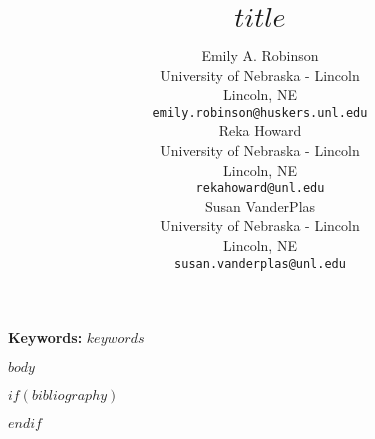 \documentclass[10pt]{article}
\title{$title$}
\author{
  Emily A. Robinson \\
  \small{University of Nebraska - Lincoln}\\
  \small{Lincoln, NE} \\
  \small{\tt emily.robinson@huskers.unl.edu} \\\And
 Reka Howard \\
  \small{University of Nebraska - Lincoln}\\
  \small{Lincoln, NE} \\
  \small{\tt rekahoward@unl.edu} \\\And
  Susan VanderPlas \\
  \small{University of Nebraska - Lincoln}\\
  \small{Lincoln, NE} \\
  \small{\tt susan.vanderplas@unl.edu} \\}
\date{}
\begin{document}
\maketitle

{\bf Keywords:} $keywords$

$body$

$if(bibliography)$

$endif$
\end{document}
